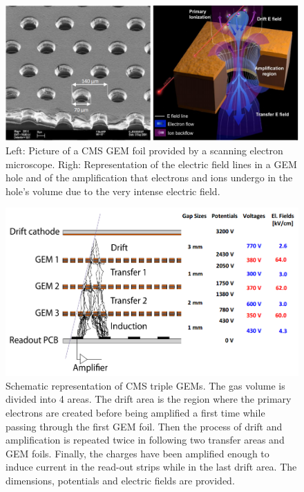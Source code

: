 	\begin{figure}[H]
		\centering
		\includegraphics[width=\plotwidth]{fig/chapt3/GEM-foil-ampli.png}
		\caption{\label{fig:GEM-foil} Left: Picture of a CMS GEM foil provided by a scanning electron microscope. Righ: Representation of the electric field lines in a GEM hole and of the amplification that electrons and ions undergo in the hole's volume due to the very intense electric field.}
	\end{figure}

	\begin{figure}[H]
		\centering
		\includegraphics[width=0.8\plotwidth]{fig/chapt3/GEM-drift.png}
		\caption{\label{fig:GEM-drift} Schematic representation of CMS triple GEMs. The gas volume is divided into 4 areas. The drift area is the region where the primary electrons are created before being amplified a first time while passing through the first GEM foil. Then the process of drift and amplification is repeated twice in following two transfer areas and GEM foils. Finally, the charges have been amplified enough to induce current in the read-out strips while in the last drift area. The dimensions, potentials and electric fields are provided.}
	\end{figure}
	
